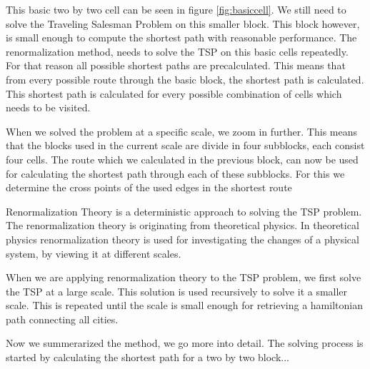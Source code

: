 This basic two by two cell can be seen in figure \ref{fig:basiccell}. We
still need to solve the Traveling Salesman Problem on this smaller block. This
block however, is small enough to compute the shortest path with reasonable
performance. The renormalization method, needs to solve the TSP on this basic
cells repeatedly. For that reason all possible shortest paths are
precalculated. This means that from every possible route through the basic
block, the shortest path is calculated. This shortest path is calculated for
every possible combination of cells which needs to be visited.

When we solved the problem at a specific scale, we zoom in further. This means
that the blocks used in the current scale are divide in four subblocks, each
consist four cells. The route which we calculated in the previous block, can
now be used for calculating the shortest path through each of these subblocks.
For this we determine the cross points of the used edges in the shortest route

Renormalization Theory is a deterministic approach to solving the TSP problem.
The renormalization theory is originating from theoretical physics. In
theoretical physics renormalization theory is used for investigating the
changes of a physical system, by viewing it at different scales.

When we are applying renormalization theory to the TSP problem, we first solve
the TSP at a large scale. This solution is used recursively to solve it a
smaller scale. This is repeated until the scale is small enough for retrieving
a hamiltonian path connecting all cities.

Now we summerarized the method, we go more into detail. The solving process is
started by calculating the shortest path for a two by two block...

